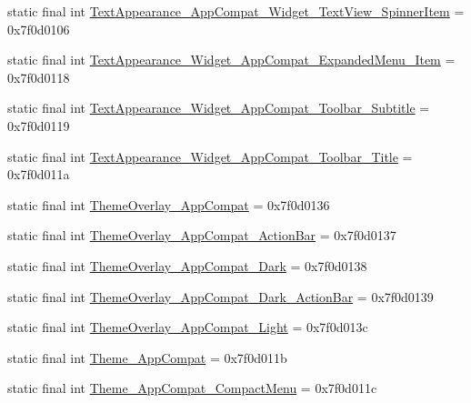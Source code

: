 \begin{DoxyCompactItemize}
static final int \mbox{\hyperlink{classcom_1_1google_1_1android_1_1gms_1_1R_1_1style_ae6723a0acd3af8356d8e8d405c1b7d43}{Text\+Appearance\+\_\+\+App\+Compat\+\_\+\+Widget\+\_\+\+Text\+View\+\_\+\+Spinner\+Item}} = 0x7f0d0106
\item 
static final int \mbox{\hyperlink{classcom_1_1google_1_1android_1_1gms_1_1R_1_1style_a87e50a7f6cee618ef81a89152ef716ba}{Text\+Appearance\+\_\+\+Widget\+\_\+\+App\+Compat\+\_\+\+Expanded\+Menu\+\_\+\+Item}} = 0x7f0d0118
\item 
static final int \mbox{\hyperlink{classcom_1_1google_1_1android_1_1gms_1_1R_1_1style_ae1c6104f0f106693cdc69365646eacfc}{Text\+Appearance\+\_\+\+Widget\+\_\+\+App\+Compat\+\_\+\+Toolbar\+\_\+\+Subtitle}} = 0x7f0d0119
\item 
static final int \mbox{\hyperlink{classcom_1_1google_1_1android_1_1gms_1_1R_1_1style_a12d4166cd339f8c91e1a8cd02ccb361e}{Text\+Appearance\+\_\+\+Widget\+\_\+\+App\+Compat\+\_\+\+Toolbar\+\_\+\+Title}} = 0x7f0d011a
\item 
static final int \mbox{\hyperlink{classcom_1_1google_1_1android_1_1gms_1_1R_1_1style_a0371e87df5348e7d7761c5e720226788}{Theme\+Overlay\+\_\+\+App\+Compat}} = 0x7f0d0136
\item 
static final int \mbox{\hyperlink{classcom_1_1google_1_1android_1_1gms_1_1R_1_1style_abe6532cc726b8ecf20f280e0ab58bbdd}{Theme\+Overlay\+\_\+\+App\+Compat\+\_\+\+Action\+Bar}} = 0x7f0d0137
\item 
static final int \mbox{\hyperlink{classcom_1_1google_1_1android_1_1gms_1_1R_1_1style_acfd775faeebb3e98d0ceca9a888e0d44}{Theme\+Overlay\+\_\+\+App\+Compat\+\_\+\+Dark}} = 0x7f0d0138
\item 
static final int \mbox{\hyperlink{classcom_1_1google_1_1android_1_1gms_1_1R_1_1style_a672da0ebdcc114d5aa5a74156b167f9b}{Theme\+Overlay\+\_\+\+App\+Compat\+\_\+\+Dark\+\_\+\+Action\+Bar}} = 0x7f0d0139
\item 
static final int \mbox{\hyperlink{classcom_1_1google_1_1android_1_1gms_1_1R_1_1style_ab5a875f5844b363394fa92f4532b80b2}{Theme\+Overlay\+\_\+\+App\+Compat\+\_\+\+Light}} = 0x7f0d013c
\item 
static final int \mbox{\hyperlink{classcom_1_1google_1_1android_1_1gms_1_1R_1_1style_a14502783d3ee6c52ca9e8e3d1a8cf1c9}{Theme\+\_\+\+App\+Compat}} = 0x7f0d011b
\item 
static final int \mbox{\hyperlink{classcom_1_1google_1_1android_1_1gms_1_1R_1_1style_ac7b68ad7ea485c5898e1b21d53153d88}{Theme\+\_\+\+App\+Compat\+\_\+\+Compact\+Menu}} = 0x7f0d011c

\end{DoxyCompactItemize}
